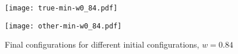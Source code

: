 \begin{figure}
\begin{minipage}[b]{0.46\linewidth}
\centering
\texttt{[image: true-min-w0\_84.pdf]}

\label{fig:figure2-1}
\end{minipage}
\hspace{0.5cm}
\begin{minipage}[b]{0.46\linewidth}
\centering
\texttt{[image: other-min-w0\_84.pdf]}


\end{minipage}

\caption{Final configurations for different initial configurations, $w=0.84$ }
\label{fig:Finalconfig-MultMin-w-0_84}

\end{figure}




